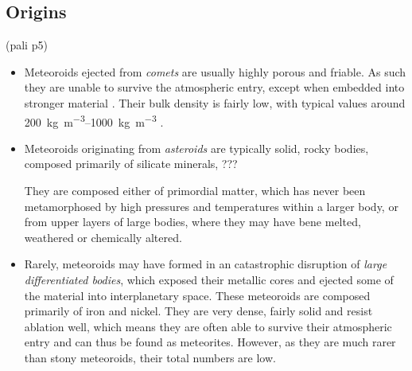     \subsection{Origins}
        (pali p5)

        \begin{itemize}
            \item Meteoroids ejected from \emph{comets} are usually highly porous and friable.
                As such they are unable to survive the atmospheric entry, except when embedded into
                stronger material \citep{nittler+2019}.
                Their bulk density is fairly low, with typical values around
                \SIrange{200}{1000}{\kilo\gram\per\cubic\metre} \citep{???} .
            \item Meteoroids originating from \emph{asteroids} are typically solid,
                rocky bodies, composed primarily of silicate minerals, ???

                They are composed either of primordial matter, which has never been metamorphosed by high pressures
                and temperatures within a larger body, or from upper layers of large bodies,
                where they may have bene melted, weathered or chemically altered.
            \item Rarely, meteoroids may have formed in an catastrophic disruption
                of \emph{large differentiated bodies}, which exposed their metallic cores
                and ejected some of the material into interplanetary space.
                These meteoroids are composed primarily of iron and nickel.
                They are very dense, fairly solid and resist ablation well,
                which means they are often able to survive their atmospheric
                entry and can thus be found as meteorites.
                However, as they are much rarer than stony meteoroids,
                their total numbers are low.
    \end{itemize}

